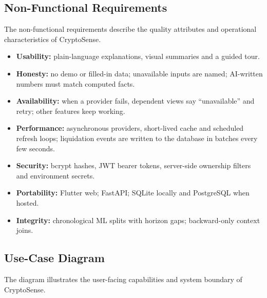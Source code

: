 \subsection{Non-Functional Requirements}
The non-functional requirements describe the quality attributes and operational characteristics of CryptoSense.
\begin{itemize}
\item \textbf{Usability:} plain-language explanations, visual summaries and a guided tour.
\item \textbf{Honesty:} no demo or filled-in data; unavailable inputs are named; AI-written numbers must match computed facts.
\item \textbf{Availability:} when a provider fails, dependent views say ``unavailable'' and retry; other features keep working.
\item \textbf{Performance:} asynchronous providers, short-lived cache and scheduled refresh loops; liquidation events are written to the database in batches every few seconds.
\item \textbf{Security:} bcrypt hashes, JWT bearer tokens, server-side ownership filters and environment secrets.
\item \textbf{Portability:} Flutter web; FastAPI; SQLite locally and PostgreSQL when hosted.
\item \textbf{Integrity:} chronological ML splits with horizon gaps; backward-only context joins.
\end{itemize}

\subsection{Use-Case Diagram}
The diagram illustrates the user-facing capabilities and system boundary of CryptoSense.

